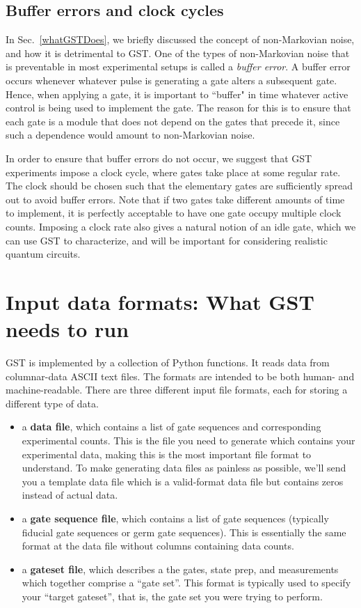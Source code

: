 \documentclass{article}[11pt]
\begin{document}
\subsection{Buffer errors and clock cycles} \label{bufferErrors}

In Sec.~\ref{whatGSTDoes}, we briefly discussed the concept of non-Markovian noise, and how it is detrimental to GST.
One of the types of non-Markovian noise that is preventable in most experimental setups is called a \emph{buffer error}.
A buffer error occurs whenever whatever pulse is generating a gate alters a subsequent gate.
Hence, when applying a gate, it is important to ``buffer" in time whatever active control is being used to implement the gate. 
The reason for this is to ensure that each gate is a module that does not depend on the gates that precede it, since such a dependence would amount to non-Markovian noise.

In order to ensure that buffer errors do not occur, we suggest that GST experiments impose a clock cycle, where gates take place at some regular rate. The clock should be chosen such that the elementary gates are sufficiently spread out to avoid buffer errors. 
Note that if two gates take different amounts of time to implement, it is perfectly acceptable to have one gate occupy multiple clock counts. 
Imposing a clock rate also gives a natural notion of an idle gate, which we can use GST to characterize, and will be important for considering realistic quantum circuits.

\section{Input data formats: What GST needs to run}

GST is implemented by a collection of Python functions.  It reads data from columnar-data ASCII text files.  The formats are intended to be both human- and machine-readable.  There are three different input file formats, each for storing a different type of data.
\begin{itemize}
\item a \textbf{data file}, which contains a list of gate sequences and corresponding experimental counts.  This is the file you need to generate which contains your experimental data, making this is the most important file format to understand.  To make generating data files as painless as possible, we'll send you a template data file which is a valid-format data file but contains zeros instead of actual data.
\item a \textbf{gate sequence file}, which contains a list of gate sequences (typically fiducial gate sequences or germ gate sequences).  This is essentially the same format at the data file without columns containing data counts.
\item a \textbf{gateset file}, which describes a the gates, state prep, and measurements which together comprise a ``gate set''.  This format is typically used to specify your ``target gateset'', that is, the gate set you were trying to perform.
\end{itemize}
\end{document}
